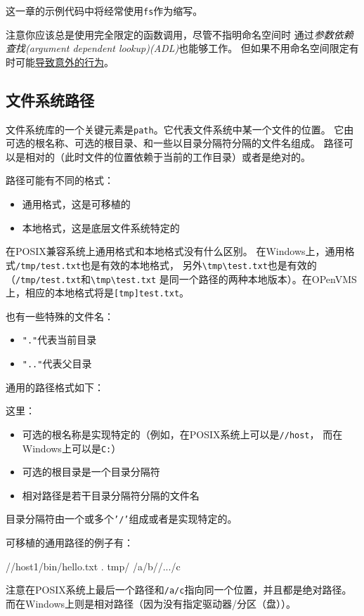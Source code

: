 这一章的示例代码中将经常使用\texttt{fs}作为缩写。

注意你应该总是使用完全限定的函数调用，尽管不指明命名空间时
通过\emph{参数依赖查找(argument dependent lookup)(ADL)}也能够工作。
但如果不用命名空间限定有时可能\hyperref[ADL导致意外行为]{导致意外的行为}。

\subsection{文件系统路径}\label{ch20.2.3}
文件系统库的一个关键元素是\texttt{path}。它代表文件系统中某一个文件的位置。
它由可选的根名称、可选的根目录、和一些以目录分隔符分隔的文件名组成。
路径可以是相对的（此时文件的位置依赖于当前的工作目录）或者是绝对的。

路径可能有不同的格式：
\begin{itemize}
    \item 通用格式，这是可移植的
    \item 本地格式，这是底层文件系统特定的
\end{itemize}
在POSIX兼容系统上通用格式和本地格式没有什么区别。
在Windows上，通用格式\texttt{/tmp/test.txt}也是有效的本地格式，
另外\texttt{\textbackslash tmp\textbackslash test.txt}也是有效的
（\texttt{/tmp/test.txt}和\texttt{\textbackslash tmp\textbackslash test.txt}
是同一个路径的两种本地版本）。在OPenVMS上，相应的本地格式将是\texttt{[tmp]test.txt}。

也有一些特殊的文件名：
\begin{itemize}
    \item \texttt{"."}代表当前目录
    \item \texttt{".."}代表父目录
\end{itemize}
通用的路径格式如下：
\begin{blacklisting}
[rootname] [rootdir] [relativepath]
\end{blacklisting}
这里：
\begin{itemize}
    \item 可选的根名称是实现特定的（例如，在POSIX系统上可以是\texttt{//host}，
    而在Windows上可以是\texttt{C:}）
    \item 可选的根目录是一个目录分隔符
    \item 相对路径是若干目录分隔符分隔的文件名
\end{itemize}
目录分隔符由一个或多个\texttt{'/'}组成或者是实现特定的。

可移植的通用路径的例子有：
\begin{blacklisting}
    //host1/bin/hello.txt
    .
    tmp/
    /a/b//.../c
\end{blacklisting}
注意在POSIX系统上最后一个路径和\texttt{/a/c}指向同一个位置，并且都是绝对路径。
而在Windows上则是相对路径（因为没有指定驱动器/分区（盘））。

